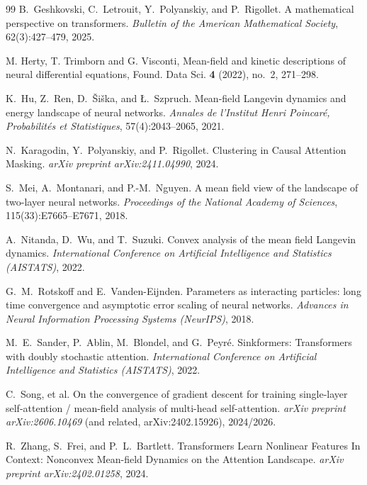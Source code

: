 \documentclass[11pt,a4wide]{article}
\theoremstyle{definition}
\begin{document}
\begin{thebibliography}{99}
 B.~Geshkovski, C.~Letrouit, Y.~Polyanskiy, and P.~Rigollet. A mathematical perspective on transformers. \emph{Bulletin of the American Mathematical Society}, 62(3):427--479, 2025.

 M. Herty, T. Trimborn and G. Visconti, Mean-field and kinetic descriptions of neural differential equations, Found. Data Sci. {\bf 4} (2022), no.~2, 271--298.

 K.~Hu, Z.~Ren, D.~{\v S}i{\v s}ka, and {\L}.~Szpruch. Mean-field Langevin dynamics and energy landscape of neural networks. \emph{Annales de l'Institut Henri Poincar\'e, Probabilit\'es et Statistiques}, 57(4):2043--2065, 2021.

 N.~Karagodin, Y.~Polyanskiy, and P.~Rigollet. Clustering in Causal Attention Masking. \emph{arXiv preprint arXiv:2411.04990}, 2024.

 S.~Mei, A.~Montanari, and P.-M.~Nguyen. A mean field view of the landscape of two-layer neural networks. \emph{Proceedings of the National Academy of Sciences}, 115(33):E7665--E7671, 2018.

 A.~Nitanda, D.~Wu, and T.~Suzuki. Convex analysis of the mean field Langevin dynamics. \emph{International Conference on Artificial Intelligence and Statistics (AISTATS)}, 2022.

 G.~M.~Rotskoff and E.~Vanden-Eijnden. Parameters as interacting particles: long time convergence and asymptotic error scaling of neural networks. \emph{Advances in Neural Information Processing Systems (NeurIPS)}, 2018.

 M.~E.~Sander, P.~Ablin, M.~Blondel, and G.~Peyr\'e. Sinkformers: Transformers with doubly stochastic attention. \emph{International Conference on Artificial Intelligence and Statistics (AISTATS)}, 2022.

 C.~Song, et al. On the convergence of gradient descent for training single-layer self-attention / mean-field analysis of multi-head self-attention. \emph{arXiv preprint arXiv:2606.10469} (and related, arXiv:2402.15926), 2024/2026.

 R.~Zhang, S.~Frei, and P.~L.~Bartlett. Transformers Learn Nonlinear Features In Context: Nonconvex Mean-field Dynamics on the Attention Landscape. \emph{arXiv preprint arXiv:2402.01258}, 2024.

\end{thebibliography}
\end{document}
